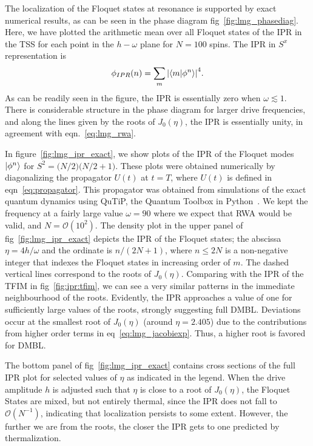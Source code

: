 \documentclass[%
reprint,
superscriptaddress,
linenumbers,
amsmath,amssymb,
aps,
prb,
showkeys,
]{revtex4-2}
\begin{document}
		The localization of the Floquet states at resonance is supported by exact numerical results, as can be seen in the phase diagram fig~\ref{fig:lmg_phasediag}. Here, we have plotted the arithmetic mean over all Floquet states of the IPR 
		in the TSS for each point in the $h-\omega$ plane for $N=100$ spins.  The IPR in $S^x$ representation is
		\begin{equation}
			\phi_{IPR}(n) = \sum_m \abs{\ip{m}{\phi^n}}^4.
			\label{eq:ipr:lmg}
		\end{equation}
		As can be readily seen in the figure, the IPR is essentially zero when  $\omega \lesssim 1$. There is considerable structure in the phase diagram for larger drive frequencies, and along the lines given by the roots of $J_0(\eta)$, the IPR is essentially unity, in agreement with eqn.~\ref{eq:lmg_rwa}.
		
		In figure~\ref{fig:lmg_ipr_exact}, we show plots of the IPR of the Floquet modes $\ket{\phi^n}$ for $S^2 = \big(N/2\big)\big(N/2 + 1\big)$.
	 These plots were obtained numerically by diagonalizing the propagator $U(t)$ at $t=T$, where $U(t)$ is defined in eqn~\ref{eq:propagator}. This propagator was obtained from simulations of the exact quantum dynamics using QuTiP, the Quantum Toolbox in Python~\cite{qutip}. We kept the frequency at a fairly large value $\omega = 90$ where we expect that RWA would be valid, and $N=\mathcal{O}(10^2)$. The density plot in the upper panel of fig~\ref{fig:lmg_ipr_exact} depicts the IPR of the Floquet states; the abscissa  $\eta=4h/\omega$ and the ordinate is $n/(2N+1)$, where $n\leq 2N$ is a non-negative integer that indexes the Floquet states in increasing order of $m$. The dashed vertical lines correspond to the roots of $J_0(\eta)$. Comparing with the IPR of the TFIM in fig~\ref{fig:ipr:tfim}, we can see a very similar patterns in the immediate neighbourhood of the roots. Evidently, the IPR approaches a value of one for sufficiently large values of the roots, strongly suggesting full DMBL. Deviations occur at the smallest root of $J_0(\eta)$ (around $\eta = 2.405$) due to the contributions from higher order terms in eq~\ref{eq:lmg_jacobiexp}. Thus, a higher root is favored for DMBL.
	
	The bottom panel of fig~\ref{fig:lmg_ipr_exact} contains cross sections of the full IPR plot for selected values of $\eta$ as indicated in the legend. When the drive amplitude $h$ is adjusted such that $\eta$ is close to a root of $J_0(\eta)$, the Floquet States are mixed, but not entirely thermal, since the IPR does not fall to $\mathcal{O}(N^{-1})$, indicating that localization persists to some extent. However, the further we are from the roots, the closer the IPR gets to one predicted by thermalization.
	
\end{document}
